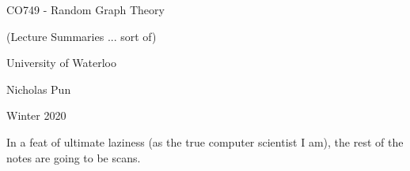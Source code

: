 \documentclass[12pt]{article}
\newcommand{\includelecture}[1]{
  
  
  \clearpage
}
\begin{document}
\begin{titlepage}
  \centering
  \vspace*{2in}
  {\huge CO749 - Random Graph Theory}\par
  {\Large (Lecture Summaries ... sort of)}\par
  \vspace{0.3in}
  {\large University of Waterloo}\par
  {\large Nicholas Pun}\par
  {\large Winter 2020}\par 
\end{titlepage}
 
\tableofcontents
\clearpage

\clearpage
\clearpage
\clearpage
\clearpage
\clearpage

In a feat of ultimate laziness (as the true computer scientist I am), the rest of the notes are going to be scans.

\includelecture{sections/lec6.pdf}
\includelecture{sections/lec7.pdf}
\includelecture{sections/lec8.pdf}
\includelecture{sections/lec9.pdf}
\includelecture{sections/lec10.pdf}

\nocite{*}


\end{document}

